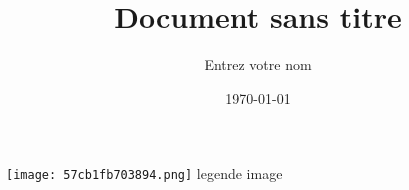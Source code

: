 \documentclass[a4paper]{article}
\title{Document sans titre}
\author{Entrez votre nom}
\date{\today}
\begin{document}
\maketitle
\newpage
\texttt{[image: 57cb1fb703894.png]}
legende image
~\\
\end{document}

